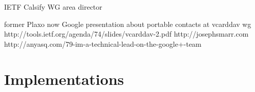\documentclass[12pt,a4paper]{scrartcl}		%
\begin{document}
\begin{description}[\breaklabel\setleftmargin{1ex}]
  \item[Peter Saint-Andre <stpeter@stpeter.im>]

    IETF Calsify WG area director

  \item[Joseph Smarr]

    former Plaxo now Google
    presentation about portable contacts at vcarddav wg http://tools.ietf.org/agenda/74/slides/vcarddav-2.pdf
    http://josephsmarr.com
    http://anyasq.com/79-im-a-technical-lead-on-the-google+-team





\end{description}



\section{Implementations}


\end{document}
